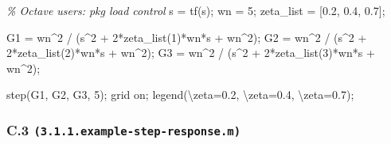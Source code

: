 \documentclass[
  11pt]{article}
\newenvironment{Shaded}{}{}
\newcommand{\CommentTok}[1]{\textcolor[rgb]{0.38,0.63,0.69}{\textit{#1}}}
\newcommand{\FloatTok}[1]{\textcolor[rgb]{0.25,0.63,0.44}{#1}}
\newcommand{\NormalTok}[1]{#1}
\newcommand{\OperatorTok}[1]{\textcolor[rgb]{0.40,0.40,0.40}{#1}}
\newcommand{\SpecialStringTok}[1]{\textcolor[rgb]{0.73,0.40,0.53}{#1}}
\newcommand{\VariableTok}[1]{\textcolor[rgb]{0.10,0.09,0.49}{#1}}
\begin{document}
\begin{Shaded}
\begin{Highlighting}[]
\CommentTok{\% Octave users: pkg load control}
\VariableTok{s} \OperatorTok{=} \VariableTok{tf}\NormalTok{(}\SpecialStringTok{\textquotesingle{}s\textquotesingle{}}\NormalTok{)}\OperatorTok{;}
\VariableTok{wn} \OperatorTok{=} \FloatTok{5}\OperatorTok{;}
\VariableTok{zeta\_list} \OperatorTok{=}\NormalTok{ [}\FloatTok{0.2}\OperatorTok{,} \FloatTok{0.4}\OperatorTok{,} \FloatTok{0.7}\NormalTok{]}\OperatorTok{;}

\VariableTok{G1} \OperatorTok{=} \VariableTok{wn}\OperatorTok{\^{}}\FloatTok{2} \OperatorTok{/}\NormalTok{ (}\VariableTok{s}\OperatorTok{\^{}}\FloatTok{2} \OperatorTok{+} \FloatTok{2}\OperatorTok{*}\VariableTok{zeta\_list}\NormalTok{(}\FloatTok{1}\NormalTok{)}\OperatorTok{*}\VariableTok{wn}\OperatorTok{*}\VariableTok{s} \OperatorTok{+} \VariableTok{wn}\OperatorTok{\^{}}\FloatTok{2}\NormalTok{)}\OperatorTok{;}
\VariableTok{G2} \OperatorTok{=} \VariableTok{wn}\OperatorTok{\^{}}\FloatTok{2} \OperatorTok{/}\NormalTok{ (}\VariableTok{s}\OperatorTok{\^{}}\FloatTok{2} \OperatorTok{+} \FloatTok{2}\OperatorTok{*}\VariableTok{zeta\_list}\NormalTok{(}\FloatTok{2}\NormalTok{)}\OperatorTok{*}\VariableTok{wn}\OperatorTok{*}\VariableTok{s} \OperatorTok{+} \VariableTok{wn}\OperatorTok{\^{}}\FloatTok{2}\NormalTok{)}\OperatorTok{;}
\VariableTok{G3} \OperatorTok{=} \VariableTok{wn}\OperatorTok{\^{}}\FloatTok{2} \OperatorTok{/}\NormalTok{ (}\VariableTok{s}\OperatorTok{\^{}}\FloatTok{2} \OperatorTok{+} \FloatTok{2}\OperatorTok{*}\VariableTok{zeta\_list}\NormalTok{(}\FloatTok{3}\NormalTok{)}\OperatorTok{*}\VariableTok{wn}\OperatorTok{*}\VariableTok{s} \OperatorTok{+} \VariableTok{wn}\OperatorTok{\^{}}\FloatTok{2}\NormalTok{)}\OperatorTok{;}

\VariableTok{step}\NormalTok{(}\VariableTok{G1}\OperatorTok{,} \VariableTok{G2}\OperatorTok{,} \VariableTok{G3}\OperatorTok{,} \FloatTok{5}\NormalTok{)}\OperatorTok{;}
\VariableTok{grid} \VariableTok{on}\OperatorTok{;}
\VariableTok{legend}\NormalTok{(}\SpecialStringTok{\textquotesingle{}\textbackslash{}zeta=0.2\textquotesingle{}}\OperatorTok{,} \SpecialStringTok{\textquotesingle{}\textbackslash{}zeta=0.4\textquotesingle{}}\OperatorTok{,} \SpecialStringTok{\textquotesingle{}\textbackslash{}zeta=0.7\textquotesingle{}}\NormalTok{)}\OperatorTok{;}
\end{Highlighting}
\end{Shaded}

\subsubsection{\texorpdfstring{C.3
\texttt{(3.1.1.example-step-response.m)}}{C.3 (3.1.1.example-step-response.m)}}\label{c.3-3.1.1.example-step-response.m}
\end{document}
